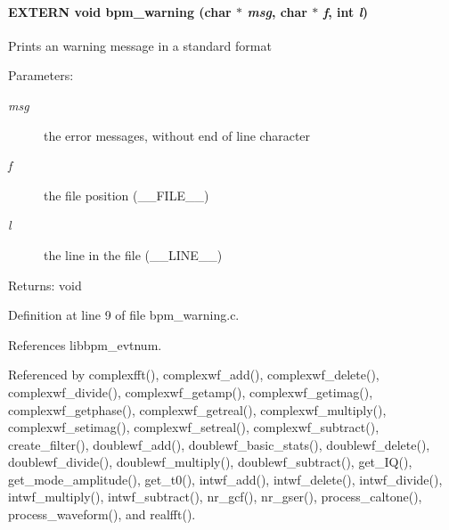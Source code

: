 \paragraph[bpm\_\-warning]{\setlength{\rightskip}{0pt plus 5cm}EXTERN void bpm\_\-warning (char $\ast$ {\em msg}, \/  char $\ast$ {\em f}, \/  int {\em l})}\hfill\label{group__message_g79c955853dd93d6184d7793b232450a2}


Prints an warning message in a standard format

\begin{Desc}
\item[Parameters:]
\begin{description}
\item[{\em msg}]the error messages, without end of line character \item[{\em f}]the file position (\_\-\_\-FILE\_\-\_\-) \item[{\em l}]the line in the file (\_\-\_\-LINE\_\-\_\-)\end{description}
\end{Desc}
\begin{Desc}
\item[Returns:]void \end{Desc}


Definition at line 9 of file bpm\_\-warning.c.

References libbpm\_\-evtnum.

Referenced by complexfft(), complexwf\_\-add(), complexwf\_\-delete(), complexwf\_\-divide(), complexwf\_\-getamp(), complexwf\_\-getimag(), complexwf\_\-getphase(), complexwf\_\-getreal(), complexwf\_\-multiply(), complexwf\_\-setimag(), complexwf\_\-setreal(), complexwf\_\-subtract(), create\_\-filter(), doublewf\_\-add(), doublewf\_\-basic\_\-stats(), doublewf\_\-delete(), doublewf\_\-divide(), doublewf\_\-multiply(), doublewf\_\-subtract(), get\_\-IQ(), get\_\-mode\_\-amplitude(), get\_\-t0(), intwf\_\-add(), intwf\_\-delete(), intwf\_\-divide(), intwf\_\-multiply(), intwf\_\-subtract(), nr\_\-gcf(), nr\_\-gser(), process\_\-caltone(), process\_\-waveform(), and realfft().